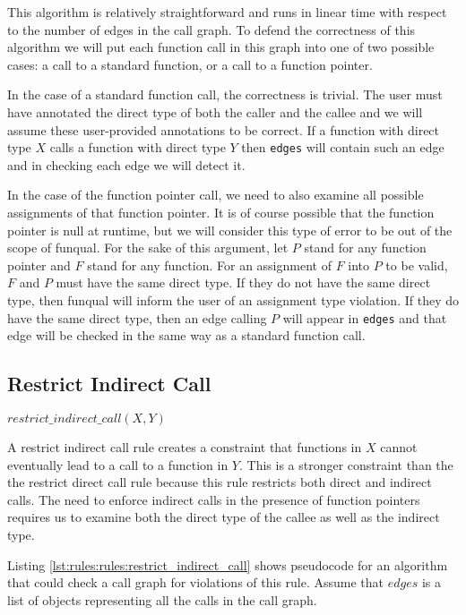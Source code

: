 This algorithm is relatively straightforward and runs in linear time with respect to the number of edges in the call graph.  To defend the correctness of this algorithm we will put each function call in this graph into one of two possible cases:  a call to a standard function, or a call to a function pointer.

In the case of a standard function call, the correctness is trivial.  The user must have annotated the direct type of both the caller and the callee and we will assume these user-provided annotations to be correct.  If a function with direct type $X$ calls a function with direct type $Y$ then \lstinline{edges} will contain such an edge and in checking each edge we will detect it.  

In the case of the function pointer call, we need to also examine all possible assignments of that function pointer.  It is of course possible that the function pointer is null at runtime, but we will consider this type of error to be out of the scope of funqual.  For the sake of this argument, let $P$ stand for any function pointer and $F$ stand for any function.  For an assignment of $F$ into $P$ to be valid, $F$ and $P$ must have the same direct type.  If they do not have the same direct type, then funqual will inform the user of an assignment type violation.  If they do have the same direct type, then an edge calling $P$ will appear in \lstinline{edges} and that edge will be checked in the same way as a standard function call.  

\subsection{Restrict Indirect Call}

\begin{center}
    $restrict\_indirect\_call(X, Y)$
\end{center}

A restrict indirect call rule creates a constraint that functions in $X$ cannot eventually lead to a call to a function in $Y$.  This is a stronger constraint than the the restrict direct call rule because this rule restricts both direct and indirect calls.  The need to enforce indirect calls in the presence of function pointers requires us to examine both the direct type of the callee as well as the indirect type. 

Listing \ref{lst:rules:rules:restrict_indirect_call} shows pseudocode for an algorithm that could check a call graph for violations of this rule.  Assume that $edges$ is a list of objects representing all the calls in the call graph.  

